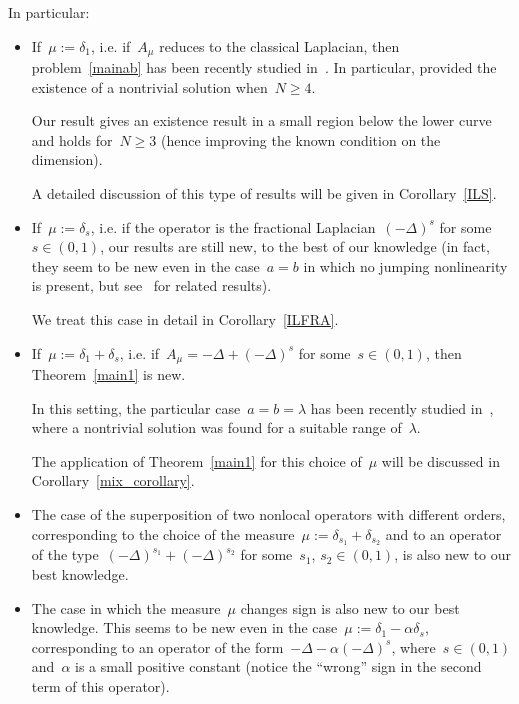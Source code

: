 \documentclass[12pt,a4paper,intlimits,sumlimits]{amsart}
\theoremstyle{definition}
\theoremstyle{plain}
\numberwithin{equation}{section}
\renewcommand{\ge}{\geqslant}
\begin{document}
In particular:
\begin{itemize}
\item If~$\mu:=\delta_1$, i.e. if~$A_\mu$ reduces to the classical Laplacian,
then problem~\eqref{mainab} has been recently studied in~\cite{MR4535437}.
In particular, \cite[Theorem 1.3]{MR4535437} provided the existence of a nontrivial solution when~$N\ge 4$.

Our result gives an existence result in a small region below the lower curve and holds for~$N\ge 3$
(hence improving the known condition on the dimension).

A detailed discussion of this type of results will be given in Corollary~\ref{ILS}.\medskip

\item If~$\mu:=\delta_s$, i.e. if the operator is the fractional Laplacian~$(-\Delta)^s$ for some~$s\in(0,1)$, our results are still new, to the best of our knowledge
(in fact, they seem to be new even in the case~$a=b$ in which no jumping nonlinearity is present,
but see~\cite{MR3060890} for related results).

We treat this case in detail in Corollary~\ref{ILFRA}.\medskip

\item If~$\mu:=\delta_1+\delta_s$, i.e. if~$A_\mu=-\Delta+(-\Delta)^s$ for some~$s\in(0,1)$,
then Theorem~\ref{main1}  is new.

In this setting, the particular case~$a=b=\lambda$ has been recently studied in~\cite[Theorem 1.4]{arXiv.2209.07502}, where a nontrivial solution was found for a suitable range of~$\lambda$.

The application of Theorem~\ref{main1} for this choice of~$\mu$ will be discussed in Corollary~\ref{mix_corollary}.\medskip

\item The case of the superposition of two nonlocal operators with different orders,
corresponding to the choice of the measure~$\mu:=\delta_{s_1}+\delta_{s_2}$ 
and to an operator of the type~$(-\Delta)^{s_1}+(-\Delta)^{s_2}$
for some~$s_1$, $s_2\in(0,1)$, is also new to our best knowledge.

\medskip

\item The case in which the measure~$\mu$ changes sign is also new to our best knowledge.
This seems to be new even in the case~$\mu:= \delta_1 -\alpha\delta_s$,
corresponding to an operator of the form~$-\Delta-\alpha(-\Delta)^s$,
where~$s\in(0,1)$ and~$\alpha$ is a small positive constant (notice the ``wrong'' sign in the second term of this operator).


\end{itemize}
\end{document}
